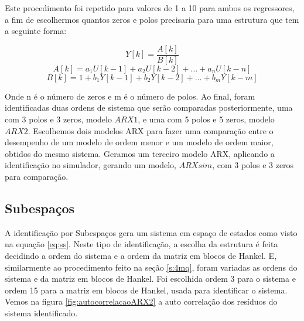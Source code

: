Este procedimento foi repetido para valores de 1 a 10 para ambos os regressores, a fim de escolhermos quantos zeros e polos precisaria para uma estrutura que tem a seguinte forma:

\begin{equation}
Y[k]=\dfrac{A[k]}{B[k]}
\end{equation}
\begin{equation}
A[k]=a_1 U[k-1]+a_2 U[k-2]+ \dots + a_n U[k-n]
\end{equation}
\begin{equation}
B[k]=1+b_1 Y[k-1]+b_2 Y[k-2]+ \dots + b_m Y[k-m]
\end{equation}

Onde n é o número de zeros e m é o número de polos. Ao final, foram identificadas duas ordens de sistema que serão comparadas posteriormente, uma com 3 polos e 3 zeros, modelo $ARX1$, e uma com 5 polos e 5 zeros, modelo $ARX2$. Escolhemos dois modelos ARX para fazer uma comparação entre o desempenho de um modelo de ordem menor e um modelo de ordem maior, obtidos do mesmo sistema. Geramos um terceiro modelo ARX, aplicando a identificação no simulador, gerando um modelo, $ARXsim$, com 3 polos e 3 zeros para comparação.

\subsection{Subespaços}\label{s:4subespacos}
A identificação por Subespaços gera um sistema em espaço de estados como visto na equação \eqref{eq:ss}. Neste tipo de identificação, a escolha da estrutura é feita decidindo a ordem do sistema e a ordem da matriz em blocos de Hankel. E, similarmente ao procedimento feito na seção \ref{s:4mq}, foram variadas as ordens do sistema e da matriz em blocos de Hankel.
Foi escolhida ordem 3 para o sistema e ordem 15 para a matriz em blocos de Hankel, usada para identificar o sistema. Vemos na figura \ref{fig:autocorrelacaoARX2} a auto correlação dos resíduos do sistema identificado. 



